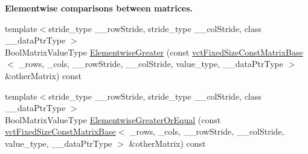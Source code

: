 \begin{Indent}{\bf Elementwise comparisons between matrices.}
\begin{DoxyCompactItemize}
\item 
{\footnotesize template$<$stride\+\_\+type \+\_\+\+\_\+row\+Stride, stride\+\_\+type \+\_\+\+\_\+col\+Stride, class \+\_\+\+\_\+data\+Ptr\+Type $>$ }\\Bool\+Matrix\+Value\+Type \hyperlink{classvct_fixed_size_const_matrix_base_a5deb3a5e417116dd88e9768d082c59e7}{Elementwise\+Greater} (const \hyperlink{classvct_fixed_size_const_matrix_base}{vct\+Fixed\+Size\+Const\+Matrix\+Base}$<$ \+\_\+rows, \+\_\+cols, \+\_\+\+\_\+row\+Stride, \+\_\+\+\_\+col\+Stride, value\+\_\+type, \+\_\+\+\_\+data\+Ptr\+Type $>$ \&other\+Matrix) const 
\item 
{\footnotesize template$<$stride\+\_\+type \+\_\+\+\_\+row\+Stride, stride\+\_\+type \+\_\+\+\_\+col\+Stride, class \+\_\+\+\_\+data\+Ptr\+Type $>$ }\\Bool\+Matrix\+Value\+Type \hyperlink{classvct_fixed_size_const_matrix_base_a09ef2795a922534541e59ad6ef877c13}{Elementwise\+Greater\+Or\+Equal} (const \hyperlink{classvct_fixed_size_const_matrix_base}{vct\+Fixed\+Size\+Const\+Matrix\+Base}$<$ \+\_\+rows, \+\_\+cols, \+\_\+\+\_\+row\+Stride, \+\_\+\+\_\+col\+Stride, value\+\_\+type, \+\_\+\+\_\+data\+Ptr\+Type $>$ \&other\+Matrix) const 
\end{DoxyCompactItemize}
\end{Indent}
